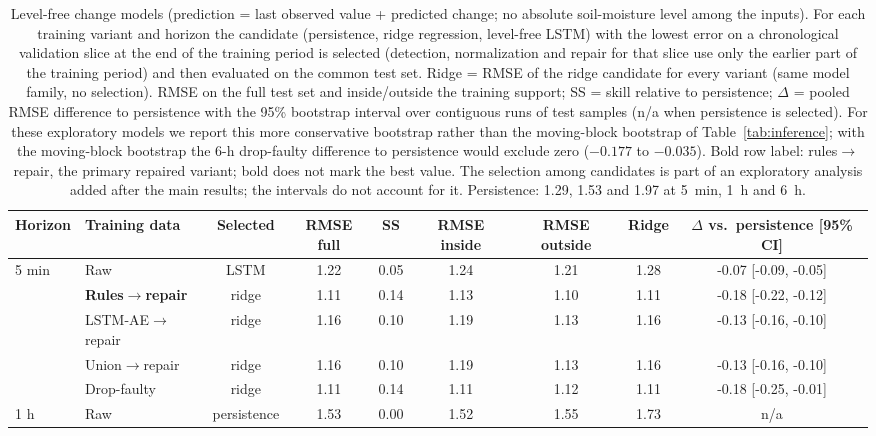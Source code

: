 \begin{table}[!t]
\footnotesize
\begin{center}
\caption{Level-free change models (prediction = last observed value + predicted change; no absolute soil-moisture level among the inputs). For each training variant and horizon the candidate (persistence, ridge regression, level-free LSTM) with the lowest error on a chronological validation slice at the end of the training period is selected (detection, normalization and repair for that slice use only the earlier part of the training period) and then evaluated on the common test set. Ridge = RMSE of the ridge candidate for every variant (same model family, no selection). RMSE on the full test set and inside/outside the training support; SS = skill relative to persistence; $\Delta$ = pooled RMSE difference to persistence with the 95\% bootstrap interval over contiguous runs of test samples (n/a when persistence is selected). For these exploratory models we report this more conservative bootstrap rather than the moving-block bootstrap of Table~\ref{tab:inference}; with the moving-block bootstrap the 6-h drop-faulty difference to persistence would exclude zero ($-0.177$ to $-0.035$). Bold row label: rules$\rightarrow$repair, the primary repaired variant; bold does not mark the best value. The selection among candidates is part of an exploratory analysis added after the main results; the intervals do not account for it. Persistence: 1.29, 1.53 and 1.97 at 5~min, 1~h and 6~h.}
\label{tab:changemodels}
\setlength{\tabcolsep}{3.5pt}
\begin{tabular}{llccccccc}
\toprule
\textbf{Horizon} & \textbf{Training data} & \textbf{Selected} & \textbf{RMSE full} & \textbf{SS} & \textbf{RMSE inside} & \textbf{RMSE outside} & \textbf{Ridge} & \textbf{$\Delta$ vs.\ persistence [95\% CI]} \\
\midrule
5 min & Raw & LSTM & 1.22 & 0.05 & 1.24 & 1.21 & 1.28 & -0.07 [-0.09, -0.05] \\
 & \textbf{Rules$\rightarrow$repair} & ridge & 1.11 & 0.14 & 1.13 & 1.10 & 1.11 & -0.18 [-0.22, -0.12] \\
 & LSTM-AE$\rightarrow$repair & ridge & 1.16 & 0.10 & 1.19 & 1.13 & 1.16 & -0.13 [-0.16, -0.10] \\
 & Union$\rightarrow$repair & ridge & 1.16 & 0.10 & 1.19 & 1.13 & 1.16 & -0.13 [-0.16, -0.10] \\
 & Drop-faulty & ridge & 1.11 & 0.14 & 1.11 & 1.12 & 1.11 & -0.18 [-0.25, -0.01] \\
\midrule
1 h & Raw & persistence & 1.53 & 0.00 & 1.52 & 1.55 & 1.73 & n/a \\

\end{tabular}
\end{center}
\end{table}

